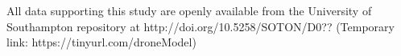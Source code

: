 \documentclass[runningheads,a4paper]{llncs}
\begin{document}
\vspace{6 pt}
\begin{scriptsize}
	
	\par
	\noindent
	All data supporting this study are openly available from the University of Southampton repository at
	http://doi.org/10.5258/SOTON/D0?? (Temporary link: https://tinyurl.com/droneModel)\\
	
	
\end{scriptsize}




\end{document}
